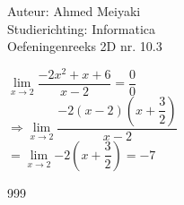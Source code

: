\documentclass[a4paper]{article}
\begin{document}
  
\noindent \large Auteur: Ahmed Meiyaki \\
\noindent \large Studierichting: Informatica\\
\noindent \large Oefeningenreeks 2D nr. 10.3\\

\medskip

\normalsize

$\lim\limits_{x \rightarrow 2} \dfrac{-2x^2 + x + 6}{x-2} = \dfrac{0}{0}$\\

$\Rightarrow \lim\limits_{x \rightarrow 2} \dfrac{-2\left(x-2\right)\left(x + \dfrac{3}{2}\right)}{x-2}$\\

$= \lim\limits_{x \rightarrow 2} {-2\left(x + \dfrac{3}{2}\right)} = -7 $\\

\begin{thebibliography}{999}
\end{thebibliography}
\end{document}
